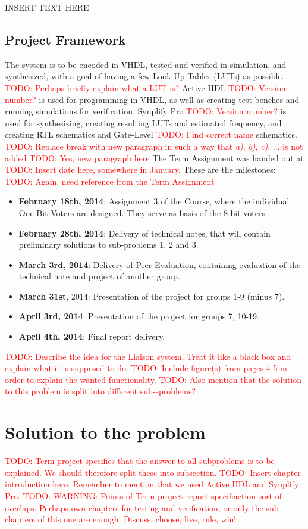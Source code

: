 \documentclass[a4paper]{IEEEtran}
\newcommand\TODO[1]{\textcolor{red}{TODO:#1}}
\newcommand\todo[1]{\TODO{#1}}
\begin{document}
INSERT TEXT HERE

\subsection{Project Framework}
The system is to be encoded in VHDL, tested and verified in simulation, and synthesized, with a goal of having a few Look Up Tables (LUTs) as possible. \todo{ Perhaps briefly explain what a LUT is?}
Active HDL \todo{ Version number?} is used for programming in VHDL, as well as creating test benches and running simulations for verification. Synplify Pro \todo{ Version number?} is used for synthesizing, creating resulting LUTs and estimated frequency, and creating RTL schematics and Gate-Level \todo{ Find correct name} schematics. 
\break 
\todo{ Replace break with new paragraph in such a way that \textit{a)}, \textit{b)}, \textit{c)}, ... is not added}
\break
\todo{ Yes, new paragraph here} The Term Assignment was handed out at \todo{ Insert date here, somewhere in January}. These are the milestones: \todo{ Again, need reference from the Term Assignment}
\begin{itemize}
    \item \textbf{February 18th, 2014}: Assignment 3 of the Course, where the individual One-Bit Voters are designed. They serve as basis of the 8-bit voters
    \item \textbf{February 28th, 2014}: Delivery of technical notes, that will contain preliminary solutions to sub-problems 1, 2 and 3.
    \item \textbf{March 3rd, 2014}: Delivery of Peer Evaluation, containing evaluation of the technical note and project of another group.
    \item \textbf{March 31st}, 2014: Presentation of the project for groups 1-9 (minus 7).
    \item \textbf{April 3rd, 2014}: Presentation of the project for groups 7, 10-19.
    \item \textbf{April 4th, 2014}: Final report delivery.
\end{itemize}



\break
\break
\todo{ Describe the idea for the Liaison system. Treat it like a black box and explain what it is supposed to do.}
\break
\break
\todo{ Include figure(s) from pages 4-5 in order to explain the wanted functionality. }
\break
\break
\todo{ Also mention that the solution to this problem is split into different sub-sproblems? }

\section{ Solution to the problem}
\todo{ Term project specifies that the answer to all subproblems is to be explained. We should therefore split these into subsection. }
\break
\break
\todo{ Insert chapter introduction here. Remember to mention that we used Active HDL and Synplify Pro.}
\break
\break
\todo{ WARNING: Points of Term project report specifiaction sort of overlaps. Perhaps own chapters for testing and verification, or only the sub-chapters of this one are enough. Discuss, choose, live, rule, win!} 
\end{document}

